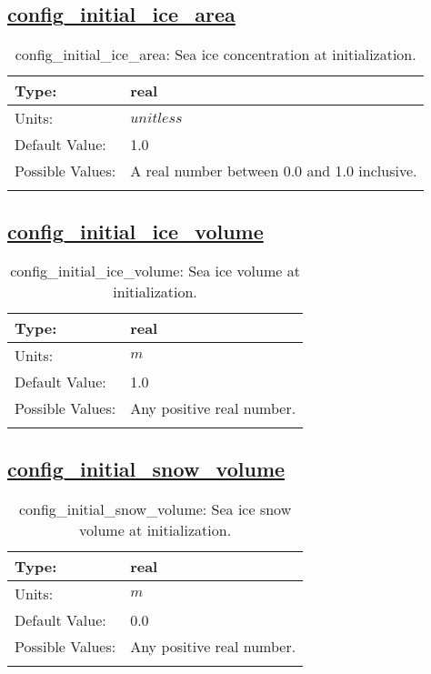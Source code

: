 \subsection[config\_initial\_ice\_area]{\hyperref[sec:nm_tab_initialize]{config\_initial\_ice\_area}}
\label{subsec:nm_sec_config_initial_ice_area}
\begin{center}
\begin{longtable}{| p{2.0in} || p{4.0in} |}
    \hline
    Type: & real \\
    \hline
    Units: & $unitless$ \\
    \hline
    Default Value: & 1.0 \\
    \hline
    Possible Values: & A real number between 0.0 and 1.0 inclusive. \\
    \hline
    \caption{config\_initial\_ice\_area: Sea ice concentration at initialization.}
\end{longtable}
\end{center}
\subsection[config\_initial\_ice\_volume]{\hyperref[sec:nm_tab_initialize]{config\_initial\_ice\_volume}}
\label{subsec:nm_sec_config_initial_ice_volume}
\begin{center}
\begin{longtable}{| p{2.0in} || p{4.0in} |}
    \hline
    Type: & real \\
    \hline
    Units: & $m$ \\
    \hline
    Default Value: & 1.0 \\
    \hline
    Possible Values: & Any positive real number. \\
    \hline
    \caption{config\_initial\_ice\_volume: Sea ice volume at initialization.}
\end{longtable}
\end{center}
\subsection[config\_initial\_snow\_volume]{\hyperref[sec:nm_tab_initialize]{config\_initial\_snow\_volume}}
\label{subsec:nm_sec_config_initial_snow_volume}
\begin{center}
\begin{longtable}{| p{2.0in} || p{4.0in} |}
    \hline
    Type: & real \\
    \hline
    Units: & $m$ \\
    \hline
    Default Value: & 0.0 \\
    \hline
    Possible Values: & Any positive real number. \\
    \hline
    \caption{config\_initial\_snow\_volume: Sea ice snow volume at initialization.}
\end{longtable}
\end{center}
